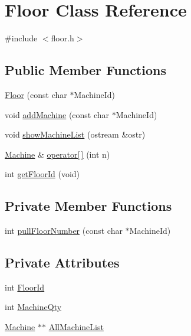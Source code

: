 \hypertarget{classFloor}{}\section{Floor Class Reference}
\label{classFloor}


{\ttfamily \#include $<$floor.\+h$>$}

\subsection*{Public Member Functions}
\begin{DoxyCompactItemize}
\item 
\hyperlink{classFloor_af8204bb1f83f7d5c34fa924e29b33f20}{Floor} (const char $\ast$Machine\+Id)
\item 
void \hyperlink{classFloor_a055387e660f3d676c4a1376bf2ad8806}{add\+Machine} (const char $\ast$Machine\+Id)
\item 
void \hyperlink{classFloor_a5fefb22532eb29c64321f999cec01fed}{show\+Machine\+List} (ostream \&ostr)
\item 
\hyperlink{classMachine}{Machine} \& \hyperlink{classFloor_ac6f944e54c67af81a6cbf20c425d2287}{operator\mbox{[}$\,$\mbox{]}} (int n)
\item 
int \hyperlink{classFloor_af18e931e369fdf479b8f0b0184bcad41}{get\+Floor\+Id} (void)
\end{DoxyCompactItemize}
\subsection*{Private Member Functions}
\begin{DoxyCompactItemize}
\item 
int \hyperlink{classFloor_a1f49915f73b08b01fb2265a7ec0aca03}{pull\+Floor\+Number} (const char $\ast$Machine\+Id)
\end{DoxyCompactItemize}
\subsection*{Private Attributes}
\begin{DoxyCompactItemize}
\item 
int \hyperlink{classFloor_a0a49a73667bcc6f03bd12a327961c2c9}{Floor\+Id}
\item 
int \hyperlink{classFloor_a1d1b0459a2779b9ebe10b0638dd7e673}{Machine\+Qty}
\item 
\hyperlink{classMachine}{Machine} $\ast$$\ast$ \hyperlink{classFloor_a654069a23fdc0108f72824e91e12f416}{All\+Machine\+List}
\end{DoxyCompactItemize}


